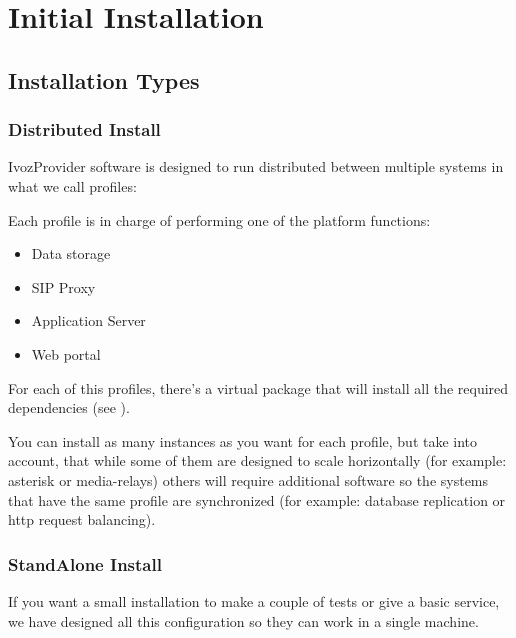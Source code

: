 \documentclass[letterpaper,10pt,english]{sphinxmanual}
\begin{document}
\chapter{Initial Installation}
\label{basic_concepts/installation/index::doc}\label{basic_concepts/installation/index:initial-installation}

\section{Installation Types}
\label{basic_concepts/installation/install_types::doc}\label{basic_concepts/installation/install_types:installation-types}

\subsection{Distributed Install}
\label{basic_concepts/installation/install_types:distributed-install}
IvozProvider software is designed to run distributed between multiple systems
in what we call profiles:

Each profile is in charge of performing one of the platform functions:
\begin{itemize}
\item {} 
Data storage

\item {} 
SIP Proxy

\item {} 
Application Server

\item {} 
Web portal

\end{itemize}

For each of this profiles, there's a virtual package that will install all the
required dependencies (see {\hyperref[basic_concepts/installation/debian_install:installing\string-profile\string-package]{}}).

You can install as many instances as you want for each profile, but take into
account, that while some of them are designed to scale horizontally (for
example: asterisk or media-relays) others will require additional software so the
systems that have the same profile are synchronized (for example: database
replication or http request balancing).


\subsection{StandAlone Install}
\label{basic_concepts/installation/install_types:standalone-install}
If you want a small installation to make a couple of tests or give a basic
service, we have designed all this configuration so they can work in a single
machine.
\end{document}
